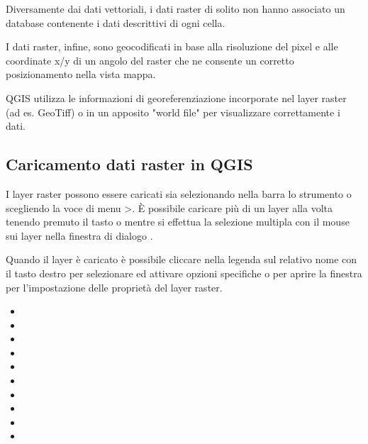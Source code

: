 Diversamente dai dati vettoriali, i dati raster di solito non hanno associato
un database contenente i dati descrittivi di ogni cella.

I dati raster, infine, sono geocodificati in base alla risoluzione del pixel e
alle coordinate x/y di un angolo del raster che ne consente un corretto
posizionamento nella vista mappa. 

QGIS utilizza le informazioni di georeferenziazione incorporate nel layer
raster (ad es. GeoTiff) o in un apposito "world file" per visualizzare
correttamente i dati.
	
\subsection{Caricamento dati raster in QGIS}\label{label_loadraster}

I layer raster possono essere caricati sia selezionando nella barra lo
strumento  o
scegliendo la voce di menu
>. È possibile caricare più di un layer alla volta tenendo premuto il
tasto  o  mentre si effettua la selezione
multipla con il mouse sui layer nella finestra di dialogo .

Quando il layer è caricato è possibile cliccare nella legenda sul relativo
nome con il tasto destro per selezionare ed attivare opzioni specifiche o per
aprire la finestra per l'impostazione delle proprietà del layer raster.


\begin{itemize}
\item {}
\item {}
\item {}
\item {}
\item {}
\item {}
\item {}
\item {}
\item {}
\item {}
\end{itemize}
	
